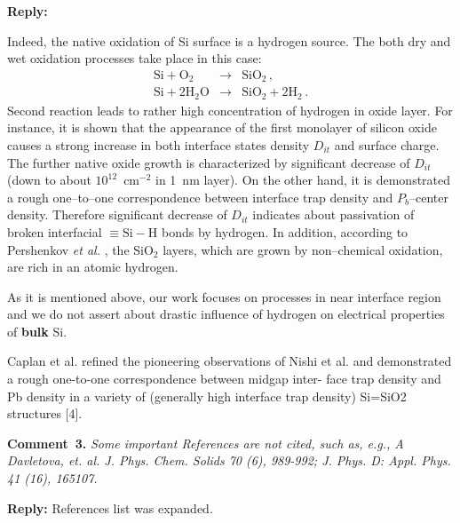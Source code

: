 \documentclass[aip,jap,preprint]{revtex4-1}
\begin{document}
\noindent
\textcolor[rgb]{0.51,0.00,0.00}{\textbf{Reply:}}

Indeed, the native oxidation of Si surface is a hydrogen source.
The both dry and wet oxidation processes take place in this case:
\begin{eqnarray}
\text{Si} + \text{O}_2&\rightarrow&\text{SiO}_2\,, \nonumber \\
\text{Si} + 2\text{H}_2\text{O}&\rightarrow&\text{SiO}_2+2\text{H}_2\,.\nonumber
\end{eqnarray}
Second reaction leads to rather high concentration of hydrogen in oxide layer.
For instance, it is shown \cite{angermann2016} that the appearance of the first monolayer of
silicon oxide causes a strong increase in both interface states density $D_{it}$ and surface charge.
The further native oxide growth is characterized by significant decrease of $D_{it}$ (down to about $10^{12}$~cm$^{-2}$ in 1~nm layer).
On the other hand, it is demonstrated \cite{Fleetwood} a rough one--to--one correspondence between interface trap density and $P_b$--center density.
Therefore significant decrease of $D_{it}$ indicates about passivation of broken interfacial $\equiv\!\mathrm{Si}\!-\!\mathrm{H}$ bonds by hydrogen.
In addition, according to Pershenkov \emph{et al.} \cite{PersenkovBook},  the SiO$_2$ layers, which are grown by non--chemical oxidation, are rich in an atomic hydrogen.

As it is mentioned above, 
our work focuses on processes  in near interface region and we do not assert about drastic influence of hydrogen on electrical properties of \textbf{bulk} Si.


Caplan et al. refined the pioneering observations of
Nishi et al. and demonstrated a rough one-to-one correspondence between midgap inter-
face trap density and Pb density in a variety of (generally high interface trap density)
Si=SiO2 structures [4].





\noindent
\textcolor[rgb]{0.00,0.50,1.00}{\textbf{Comment~3.}}
\emph{ Some important References are not cited, such as, e.g., A Davletova, et. al. J. Phys. Chem. Solids 70 (6), 989-992; J. Phys. D: Appl. Phys. 41 (16), 165107.}

\noindent
\textcolor[rgb]{0.51,0.00,0.00}{\textbf{Reply:}}
References list was expanded.



\end{document}
